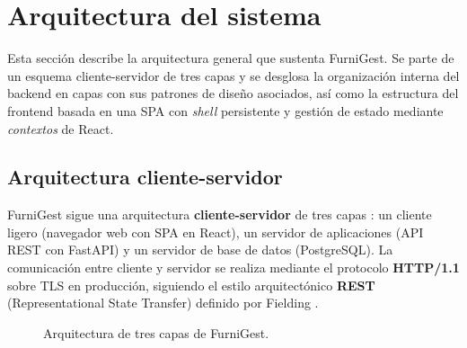 \documentclass[12pt,twoside,titlepage]{report}
\begin{document}
\section{Arquitectura del sistema}

Esta sección describe la arquitectura general que sustenta FurniGest. Se parte de un esquema cliente-servidor de tres capas y se desglosa la organización interna del backend en capas con sus patrones de diseño asociados, así como la estructura del frontend basada en una SPA con \emph{shell} persistente y gestión de estado mediante \emph{contextos} de React.

\subsection{Arquitectura cliente-servidor}

FurniGest sigue una arquitectura \textbf{cliente-servidor} de tres capas \cite{tanenbaum}: un cliente ligero (navegador web con SPA en React), un servidor de aplicaciones (API REST con FastAPI) y un servidor de base de datos (PostgreSQL). La comunicación entre cliente y servidor se realiza mediante el protocolo \textbf{HTTP/1.1} \cite{kurose} sobre TLS en producción, siguiendo el estilo arquitectónico \textbf{REST} (Representational State Transfer) definido por Fielding \cite{fieldingREST}.

\begin{figure}[H]
  \centering
  \caption{Arquitectura de tres capas de FurniGest.}
  \label{fig:arquitectura_3capas}
\end{figure}
\end{document}
